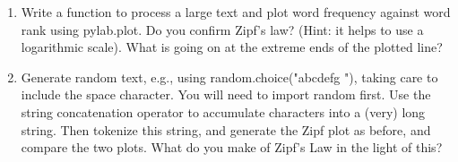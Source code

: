 \documentclass[11pt]{article}
\begin{document}
\begin{enumerate}
	
	\item Write a function to process a large text and plot word frequency against word rank using pylab.plot. Do you confirm Zipf's law? (Hint: it helps to use a logarithmic scale). What is going on at the extreme ends of the plotted line?
	
	\item Generate random text, e.g., using random.choice("abcdefg "), taking care to include the space character. You will need to import random first. Use the string concatenation operator to accumulate characters into a (very) long string. Then tokenize this string, and generate the Zipf plot as before, and compare the two plots. What do you make of Zipf's Law in the light of this?

\end{enumerate}
\end{document}
